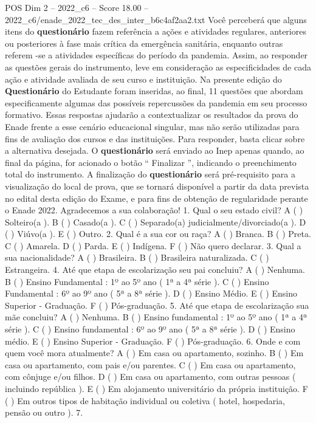 \begin{textsample}{POS Dim 2 – 2022\_c6 – Score 18.00 – 2022\_c6/enade\_2022\_tec\_des\_inter\_b6c4af2aa2.txt}
Você perceberá que alguns itens do \textbf{questionário} fazem referência a ações e atividades regulares, anteriores ou posteriores à fase mais crítica da emergência sanitária, enquanto outras referem -se a atividades específicas do período da pandemia.
Assim, ao responder as questões gerais do instrumento, leve em consideração as especificidades de cada ação e atividade avaliada de seu curso e instituição.
Na presente edição do \textbf{Questionário} do Estudante foram inseridas, ao final, 11 questões que abordam especificamente algumas das possíveis repercussões da pandemia em seu processo formativo.
Essas respostas ajudarão a contextualizar os resultados da prova do Enade frente a esse cenário educacional singular, mas não serão utilizadas para fins de avaliação dos cursos e das instituições.
Para responder, basta clicar sobre a alternativa desejada.
O \textbf{questionário} será enviado ao Inep apenas quando, ao final da página, for acionado o botão “ Finalizar ”, indicando o preenchimento total do instrumento.
A finalização do \textbf{questionário} será pré-requisito para a visualização do local de prova, que se tornará disponível a partir da data prevista no edital desta edição do Exame, e para fins de obtenção de regularidade perante o Enade 2022.
Agradecemos a sua colaboração! 1.
Qual o seu estado civil?
A ( ) Solteiro(a ).
B ( ) Casado(a ).
C ( ) Separado(a) judicialmente/divorciado(a ).
D ( ) Viúvo(a ).
E ( ) Outro. 2.
Qual é a sua cor ou raça?
A ( ) Branca.
B ( ) Preta.
C ( ) Amarela.
D ( ) Parda.
E ( ) Indígena.
F ( ) Não quero declarar. 3.
Qual a sua nacionalidade?
A ( ) Brasileira.
B ( ) Brasileira naturalizada.
C ( ) Estrangeira. 4.
Até que etapa de escolarização seu pai concluiu?
A ( ) Nenhuma.
B ( ) Ensino Fundamental : 1º ao 5º ano ( 1ª a 4ª série ).
C ( ) Ensino Fundamental : 6º ao 9º ano ( 5ª a 8ª série ).
D ( ) Ensino Médio.
E ( ) Ensino Superior - Graduação.
F ( ) Pós-graduação. 5.
Até que etapa de escolarização sua mãe concluiu?
A ( ) Nenhuma.
B ( ) Ensino fundamental : 1º ao 5º ano ( 1ª a 4ª série ).
C ( ) Ensino fundamental : 6º ao 9º ano ( 5ª a 8ª série ).
D ( ) Ensino médio.
E ( ) Ensino Superior - Graduação.
F ( ) Pós-graduação. 6.
Onde e com quem você mora atualmente?
A ( ) Em casa ou apartamento, sozinho.
B ( ) Em casa ou apartamento, com pais e/ou parentes.
C ( ) Em casa ou apartamento, com cônjuge e/ou filhos.
D ( ) Em casa ou apartamento, com outras pessoas ( incluindo república ).
E ( ) Em alojamento universitário da própria instituição.
F ( ) Em outros tipos de habitação individual ou coletiva ( hotel, hospedaria, pensão ou outro ). 7.

\end{textsample}
